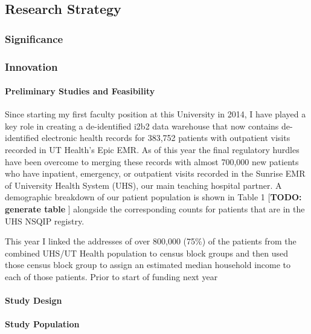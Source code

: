 \subsection{Research Strategy}\label{research-strategy}


\subsubsection{Significance}\label{significance}

\subsubsection{Innovation}\label{innovation}

\paragraph{Preliminary Studies and Feasibility}\label{preliminary-studies-and-feasibility} 
Since starting my first faculty position at this University in 2014, I have played a key role in creating a de-identified i2b2 data warehouse that now contains de-identified electronic health records for 383,752 patients with outpatient visits recorded in UT Health's Epic EMR. As of this year the final regulatory hurdles have been overcome to merging these records with almost 700,000 new patients who have inpatient, emergency, or outpatient visits recorded in the Sunrise EMR of University Health System (UHS), our main teaching hospital partner. A demographic breakdown of our patient population is shown in Table 1 [\textbf{TODO: generate table }] alongside the corresponding counts for patients that are in the UHS NSQIP registry.

This year I linked the addresses of over 800,000 (75\%) of the patients from the combined UHS/UT Health population to census block groups and then used those census block group to assign an estimated median household income to each of those patients. Prior to start of funding next year


\paragraph{Study Design}\label{study-design}


\paragraph{Study Population}\label{study-population}


